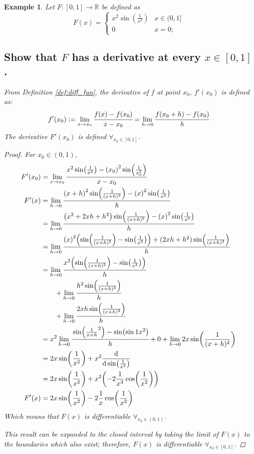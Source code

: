 \documentclass[]{article}
\newcommand{\R}{\mathbb{R}}
\newtheorem{example}{Example}
\begin{document}
\begin{example}
    Let $F : [0,1] \to \R$ be defined as\[
        F(x) = \begin{cases}
            x^2 \sin(\frac{1}{x^2}) & x \in (0,1]\\
            0 & x = 0;
        \end{cases}
    \]
    \subsection{Show that $F$ has a derivative at every $x\in [0,1]$.}
    From Definition \ref{def:diff_fun}, the derivative of $f$ at point $x_0$, $f'(x_0)$ is defined as:\[
        f'(x_0) := \lim_{x \to x_0} \cfrac{f(x) - f(x_0)}{x - x_0}
        = \lim_{h \to 0} \cfrac{f(x_0+h) - f(x_0)}{h}
    \]
    The derivative $F'(x_0)$ is defined $\forall_{x_0 \in [0,1]}$.
    \begin{proof}
        For $x_0 \in (0,1)$,\begin{align*}
            F'(x_0) 
                &= \lim_{x \to x_0} \cfrac{
                    x^2 \sin(\frac{1}{x^2}) - \qty(x_0)^2 \sin(\frac{1}{x_0^2})
                }{x - x_0}\\
            F'(x)
                &= \lim_{h \to 0} \cfrac{
                    \qty(x+h)^2 \sin(\frac{1}{(x+h)^2}) - \qty(x)^2 \sin(\frac{1}{x^2})
                }{h}\\
                &= \lim_{h \to 0} \cfrac{
                    \qty(x^2 + 2 xh + h^2) \sin(\frac{1}{(x+h)^2}) - \qty(x)^2 \sin(\frac{1}{x^2})
                }{h}\\
                &= \lim_{h \to 0} \cfrac{
                    \qty(x)^2 \qty(\sin(\frac{1}{(x+h)^2}) - \sin(\frac{1}{x^2})) + (2 xh + h^2) \sin(\frac{1}{(x+h)^2})
                }{h}\\
                &= \lim_{h \to 0} \cfrac{x^2 \qty(\sin(\frac{1}{(x+h)^2}) - \sin(\frac{1}{x^2}))}{h}\\
                    &\qquad + \lim_{h \to 0} \cfrac{h^2 \sin(\frac{1}{(x+h)^2})}{h}\\
                    &\qquad + \lim_{h \to 0} \cfrac{2 x h \sin(\frac{1}{(x+h)^2})}{h}\\
                &= x^2 \lim_{h \to 0} \cfrac{\sin(\frac{1}{x+h}^2) - \sin(\sin{1}{x^2})}{h}
                    + 0 + \lim_{h \to 0} 2 x \sin(\frac{1}{(x+h)^2})\\
                &= 2 x \sin(\frac{1}{x^2}) + x^2 \dv{\sin(\frac{1}{x^2})}\\
                &= 2 x \sin(\frac{1}{x^2}) + x^2 \qty(-2\frac{1}{x^3} \cos(\frac{1}{x^2}))\\
            F'(x)
                &= 2 x \sin(\frac{1}{x^2}) - 2 \frac{1}{x} \cos(\frac{1}{x^2})
        \end{align*}
        Which means that $F(x)$ is differentiable $\forall_{x_0 \in (0,1)}$.

        This result can be expanded to the closed interval by taking the limit of $F(x)$ to the boundaries which also exist; therefore, $F(x)$ is differentiable $\forall_{x_0 \in [0,1]}$.
    \end{proof}    
\end{example}
\end{document}
